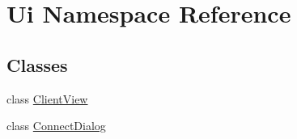 \hypertarget{namespace_ui}{}\section{Ui Namespace Reference}
\label{namespace_ui}
\subsection*{Classes}
\begin{DoxyCompactItemize}
\item 
class \hyperlink{class_ui_1_1_client_view}{Client\+View}
\item 
class \hyperlink{class_ui_1_1_connect_dialog}{Connect\+Dialog}
\end{DoxyCompactItemize}
